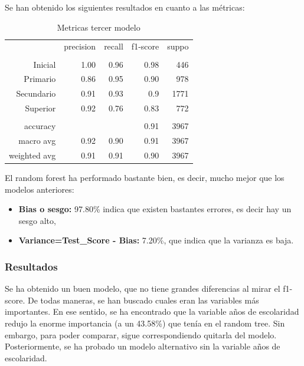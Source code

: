 \documentclass[a4paper]{article}
\begin{document}
            Se han obtenido los siguientes resultados en cuanto a las métricas:
            \begin{table}[H]
                \centering
                \begin{tabular}{rrrrr}
                    ~ & precision & recall & f1-score & suppo \\
                    & & & & \\
                    Inicial    & 1.00 & 0.96 & 0.98 & 446 \\
                    Primario   & 0.86 & 0.95 & 0.90 & 978 \\
                    Secundario & 0.91 & 0.93 & 0.9 & 1771 \\
                    Superior   & 0.92 & 0.76 & 0.83 & 772 \\
                    & & & & \\
                    accuracy & & & 0.91 & 3967 \\
                    macro avg & 0.92 & 0.90 & 0.91 & 3967 \\
                    weighted avg & 0.91 & 0.91 & 0.90 & 3967 \\
                \end{tabular}
                \caption{Metricas tercer modelo}
                \label{Thrid model metrics}
            \end{table}

             El random forest ha performado bastante bien, es decir, mucho mejor que los modelos anteriores:
             \begin{itemize}
                \item \textbf{Bias o sesgo:} 97.80\% indica que existen bastantes errores, es decir hay un sesgo alto,
                \item \textbf{Variance=Test\_Score - Bias:} 7.20\%, que indica que la varianza es baja.
             \end{itemize}

            \subsubsection*{Resultados}

             Se ha obtenido un buen modelo, que no tiene grandes diferencias al mirar el f1-score. De todas maneras, se han buscado cuales eran las variables más importantes. En ese sentido, se ha encontrado que la variable años de escolaridad redujo la enorme importancia (a un 43.58\%) que tenía en el random tree. Sin embargo, para poder comparar, sigue correspondiendo quitarla del modelo. Posteriormente, se ha probado un modelo alternativo sin la variable años de escolaridad. 
\end{document}
